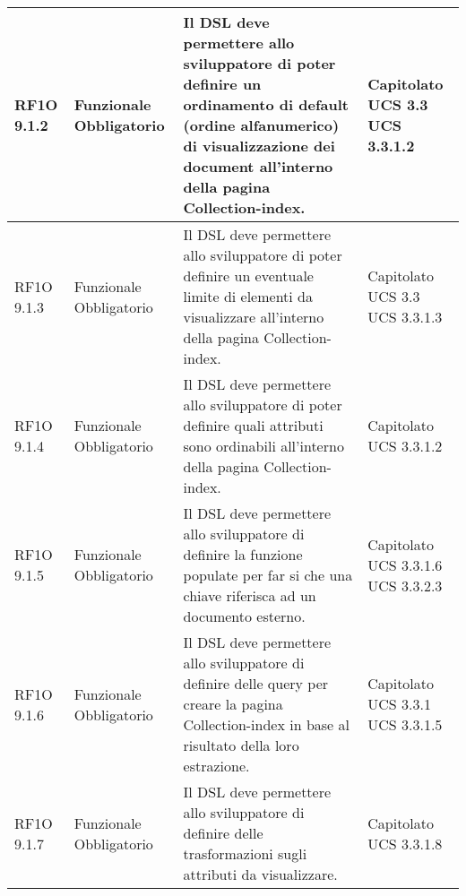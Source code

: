 \begin{center}
\begin{longtable}{ | l | p{2cm} | p{5cm} | p{1.7cm} |}
				RF1O 9.1.2 & Funzionale \newline  Obbligatorio  & Il DSL deve permettere allo sviluppatore di poter definire un ordinamento di default (ordine alfanumerico) di visualizzazione dei document all'interno della pagina Collection-index. &  Capitolato \newline  UCS 3.3 \newline  UCS 3.3.1.2 \newline  \\ \hline      
				RF1O 9.1.3 & Funzionale \newline  Obbligatorio  & Il DSL deve permettere allo sviluppatore di poter definire un eventuale limite di elementi da visualizzare all’interno della pagina Collection-index. &  Capitolato \newline  UCS 3.3 \newline  UCS 3.3.1.3 \newline  \\ \hline      
				RF1O 9.1.4 & Funzionale \newline  Obbligatorio  & Il DSL deve permettere allo sviluppatore di poter definire quali attributi sono ordinabili all’interno della pagina Collection-index. &  Capitolato \newline  UCS 3.3.1.2 \newline  \\ \hline      
				RF1O 9.1.5 & Funzionale \newline  Obbligatorio  & Il DSL deve permettere allo sviluppatore di definire la funzione populate per far si che una chiave riferisca ad un documento esterno. &  Capitolato \newline  UCS 3.3.1.6 \newline  UCS 3.3.2.3 \newline  \\ \hline      
				RF1O 9.1.6 & Funzionale \newline  Obbligatorio  & Il DSL deve permettere allo sviluppatore di definire delle query per creare la pagina Collection-index in base al risultato della loro estrazione. &  Capitolato \newline  UCS 3.3.1 \newline  UCS 3.3.1.5 \newline  \\ \hline      
				RF1O 9.1.7 & Funzionale \newline  Obbligatorio  & Il DSL deve permettere allo sviluppatore di definire delle trasformazioni sugli attributi da visualizzare. &  Capitolato \newline  UCS 3.3.1.8 \newline  \\ \hline      

\end{longtable}
\end{center}
